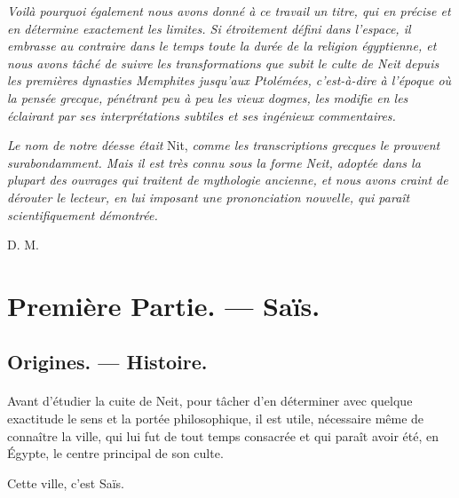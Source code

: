 \documentclass[a4paper, 11pt, oneside]{article}
\begin{document}
\emph{Voilà pourquoi également nous avons donné à ce travail un titre, qui en précise et en détermine exactement les limites. Si étroitement défini dans l'espace, il embrasse au contraire dans le temps toute la durée de la religion égyptienne, et nous avons tâché de suivre les transformations que subit le culte de Neit depuis les premières dynasties Memphites jusqu'aux Ptolémées, c'est-à-dire à l'époque où la pensée grecque, pénétrant peu à peu les vieux dogmes, les modifie en les éclairant par ses interprétations subtiles et ses ingénieux commentaires.}

\emph{Le nom de notre déesse était} Nit, \emph{comme les transcriptions grecques le prouvent surabondamment. Mais il est très connu sous la forme Neit, adoptée dans la plupart des ouvrages qui traitent de mythologie ancienne, et nous avons craint de dérouter le lecteur, en lui imposant une prononciation nouvelle, qui paraît scientifiquement démontrée.}

D. M.
\clearpage
\section{Première Partie. --- Saïs.}
\subsection{Origines. --- Histoire.}
\paragraph{}
Avant d'étudier la cuite de Neit, pour tâcher d'en déterminer avec quelque exactitude le sens et la portée philosophique, il est utile, nécessaire même de connaître la ville, qui lui fut de tout temps consacrée et qui paraît avoir été, en Égypte, le centre principal de son culte.

Cette ville, c'est Saïs.
\end{document}
